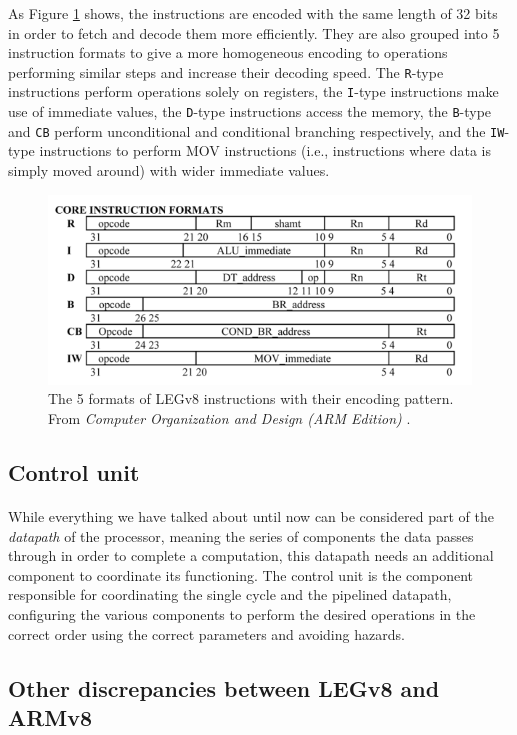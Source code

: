 As Figure \ref{fig:legv8instrencod} shows, the instructions are encoded with the same length of 32 bits in order to fetch and decode them more efficiently. They are also grouped into 5 instruction formats to give a more homogeneous encoding to operations performing similar steps and increase their decoding speed.
The \verb|R|-type instructions perform operations solely on registers, the \verb|I|-type instructions make use of immediate values, the \verb|D|-type instructions access the memory, the \verb|B|-type and \verb|CB| perform unconditional and conditional branching respectively, and the \verb|IW|-type instructions to perform MOV instructions (i.e., instructions where data is simply moved around) with wider immediate values.
\begin{figure}[H]
	\centering
	\includegraphics[width=1\textwidth]{img/instruction_types.png}
	\caption{The 5 formats of LEGv8 instructions with their encoding pattern. From \emph{Computer Organization and Design (ARM Edition)} \cite{patterson2016computer}.}
 \label{fig:legv8instrencod}
\end{figure}
\subsection{Control unit}
\paragraph{}
While everything we have talked about until now can be considered part of the \emph{datapath} of the processor, meaning the series of components the data passes through in order to complete a computation, this datapath needs an additional component to coordinate its functioning. The control unit is the component responsible for coordinating the single cycle and the pipelined datapath, configuring the various components to perform the desired operations in the correct order using the correct parameters and avoiding hazards.
\subsection{Other discrepancies between LEGv8 and ARMv8}
